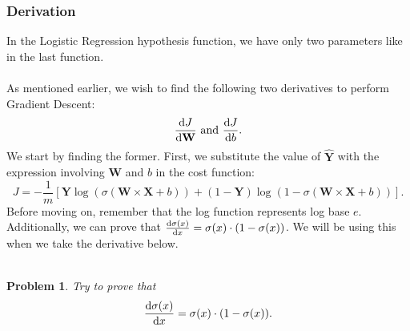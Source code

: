 \documentclass{article}
\newtheorem*{problem}{Problem}
\begin{document}
\subsubsection{Derivation}
In the Logistic Regression hypothesis function, we have only two parameters like in the last function. 
\\
\\
As mentioned earlier, we wish to find the following two derivatives to perform Gradient Descent:
\[\diff{J}{\textbf{W}}\text{ and }\diff{J}{b}.\]
We start by finding the former. First, we substitute the value of $\hat{\textbf{Y}}$ with the expression involving \textbf{W} and $b$ in the cost function:
\[J=-\frac{1}{m}\left[\textbf{Y}\log{(\sigma(\textbf{W}\times \textbf{X}+b))}+(1-\textbf{Y})\log{(1-\sigma(\textbf{W}\times \textbf{X}+b))}\right].\]
Before moving on, remember that the log function represents log base $e$. Additionally, we can prove that $\diff{\sigma(x)}{x}=\sigma(x) \cdot (1 - \sigma(x))$. We will be using this when we take the derivative below.
\\
\\
\begin{problem}
Try to prove that $$\diff{\sigma(x)}{x}=\sigma(x) \cdot (1 - \sigma(x)).$$
\end{problem}
\end{document}
